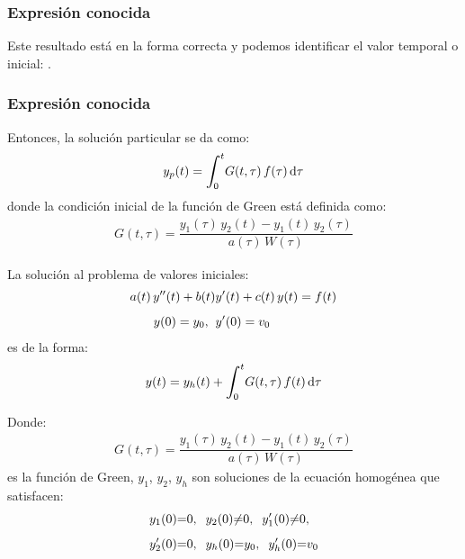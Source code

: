 \documentclass[12pt]{beamer}
\begin{document}
\begin{frame}
\frametitle{Expresión conocida}
Este resultado está en la forma correcta y podemos identificar el valor temporal o inicial: . 
\end{frame}
\begin{frame}
\frametitle{Expresión conocida}
Entonces, la solución particular se da como:
\pause
\begin{align}
y_{p} (t) = \scaleint{6ex}_{\bs 0}^{t} G (t, \tau) \, f (\tau) \dd{\tau}
\label{eq:ecuacion_07_20}
\end{align}
\pause
donde la condición inicial de la función de Green está definida como:
\begin{align*}
G (t, \tau) = \dfrac{y_{1} (\tau) \, y_{2} (t) - y_{1} (t) \, y_{2} (\tau)}{a (\tau) \, W (\tau)}
\end{align*}
\end{frame}
\begin{frame}[plain]
\begin{tcolorbox}[title={\centering Solución para problema de valores iniciales con la función de Green}]
La solución al problema de valores iniciales:
\begin{align*}
a (t) \, {y}^{\prime \prime} (t) + b (t) &{y}^{\prime} (t) + c (t) \, y (t) = f (t) \\[0.5em]
y (0) = y_{0}, \hspace{0.2cm} &{y}^{\prime} (0) = v_{0}
\end{align*}
\pause
es de la forma:
\begin{align}
y (t) = y_{h} (t) + \scaleint{6ex}_{\bs 0}^{t} G (t, \tau) \, f (t) \dd{\tau}
\label{eq:ecuacion_07_21}
\end{align}
\end{tcolorbox}
\end{frame}
\begin{frame}[plain]
\begin{tcolorbox}[title={\centering Solución para problema de valores iniciales con la función de Green}]
Donde:
\begin{align}
G (t, \tau) = \dfrac{y_{1} (\tau) \, y_{2} (t) - y_{1} (t) \, y_{2} (\tau)}{a (\tau) \, W (\tau)}
\label{eq:ecuacion_07_22}
\end{align}
es la función de Green, \pause $y_{1}$, $y_{2}$, $y_{h}$ son soluciones de la ecuación homogénea que satisfacen:
\begin{align*}
&y_{1} (0) {=} 0, \hspace{0.2cm} y_{2} (0) {\neq} 0, \hspace{0.2cm} {y}^{\prime}_{1} (0) {\neq} 0, \\[0.5em]
&{y}^{\prime}_{2} (0) {=} 0, \hspace{0.2cm} y_{h} (0) {=} y_{0}, \hspace{0.2cm} {y}^{\prime}_{h} (0) {=} v_{0}
\end{align*}
\end{tcolorbox}
\end{frame}
\end{document}

